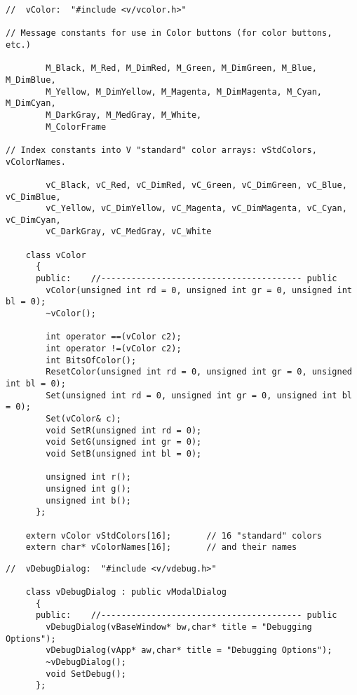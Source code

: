 
\footnotesize
\begin{verbatim}
//  vColor:  "#include <v/vcolor.h>"

// Message constants for use in Color buttons (for color buttons, etc.)

        M_Black, M_Red, M_DimRed, M_Green, M_DimGreen, M_Blue, M_DimBlue,
        M_Yellow, M_DimYellow, M_Magenta, M_DimMagenta, M_Cyan, M_DimCyan,
        M_DarkGray, M_MedGray, M_White,
        M_ColorFrame

// Index constants into V "standard" color arrays: vStdColors, vColorNames.

        vC_Black, vC_Red, vC_DimRed, vC_Green, vC_DimGreen, vC_Blue, vC_DimBlue,
        vC_Yellow, vC_DimYellow, vC_Magenta, vC_DimMagenta, vC_Cyan, vC_DimCyan,
        vC_DarkGray, vC_MedGray, vC_White

    class vColor
      {
      public:    //---------------------------------------- public
        vColor(unsigned int rd = 0, unsigned int gr = 0, unsigned int bl = 0);
        ~vColor();

        int operator ==(vColor c2);
        int operator !=(vColor c2);
        int BitsOfColor();
        ResetColor(unsigned int rd = 0, unsigned int gr = 0, unsigned int bl = 0);
        Set(unsigned int rd = 0, unsigned int gr = 0, unsigned int bl = 0);
        Set(vColor& c);
        void SetR(unsigned int rd = 0);
        void SetG(unsigned int gr = 0);
        void SetB(unsigned int bl = 0);

        unsigned int r();
        unsigned int g();
        unsigned int b();
      };

    extern vColor vStdColors[16];       // 16 "standard" colors
    extern char* vColorNames[16];       // and their names
\end{verbatim}
\normalfont\normalsize


\footnotesize
\begin{verbatim}
//  vDebugDialog:  "#include <v/vdebug.h>"

    class vDebugDialog : public vModalDialog
      {
      public:    //---------------------------------------- public
        vDebugDialog(vBaseWindow* bw,char* title = "Debugging Options");
        vDebugDialog(vApp* aw,char* title = "Debugging Options");
        ~vDebugDialog();
        void SetDebug();
      };
\end{verbatim}
\normalfont\normalsize

